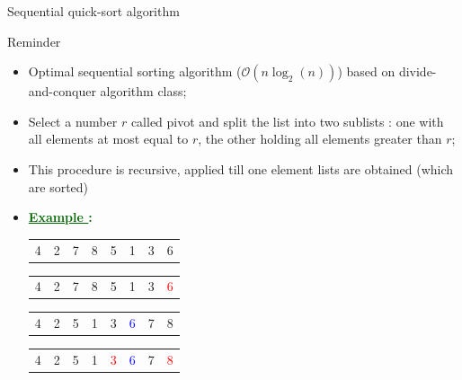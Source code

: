 \documentclass[compress,10pt,aspectratio=169]{beamer}
\begin{document}
\begin{frame}[fragile]{Sequential quick-sort algorithm}
    \scriptsize
    \begin{block}{\small Reminder}
        \begin{itemize}
            \item Optimal sequential sorting algorithm ($\mathcal{O}(n\log_{2}(n))$) based on divide-and-conquer algorithm class;
            \item Select a number $r$ called \alert{pivot} and split the list into two sublists : one with all elements at most equal
                  to $r$, the other holding all elements greater than $r$;
            \item This procedure is recursive, applied till one element lists are obtained (which are sorted)
            \item \textcolor{DarkGreen}{\bf \underline{Example }: }
             {
            \begin{center}
                \begin{tabular}{cccccccc}
                    4 & 2 & 7 & 8 & 5 & 1 & 3 & 6 \\
                \end{tabular}
            \end{center}
            }
             { 
            \begin{center}
                \begin{tabular}{cccccccc}
                    4 & 2 & 7 & 8 & 5 & 1 & 3 & \textcolor{red}{6} \\
                \end{tabular}
            \end{center}
            }
             { 
            \begin{center}
                \begin{tabular}{cccccccc}
                    4 & 2 & 5 & 1 & 3 & \textcolor{blue}{6} & 7 & 8 \\
                \end{tabular}
            \end{center}
            }
             { 
            \begin{center}
                \begin{tabular}{cccccccc}
                    4 & 2 & 5 & 1 & \textcolor{red}{3} & \textcolor{blue}{6} & 7 & \textcolor{red}{8} \\
                \end{tabular}
            \end{center}
}
\end{itemize}
\end{block}
\end{frame}
\end{document}
